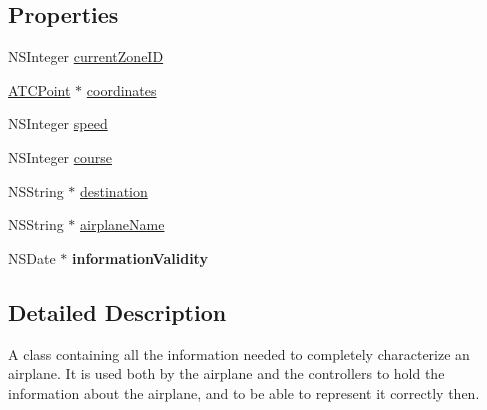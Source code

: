\subsection*{\-Properties}
\begin{DoxyCompactItemize}
\item 
\-N\-S\-Integer \hyperlink{interface_a_t_c_airplane_information_af795c45df27d97b4194ea6c1f640cf9f}{current\-Zone\-I\-D}
\item 
\hyperlink{interface_a_t_c_point}{\-A\-T\-C\-Point} $\ast$ \hyperlink{interface_a_t_c_airplane_information_a1feb624e5acd0a158e94f089f977c38c}{coordinates}
\item 
\-N\-S\-Integer \hyperlink{interface_a_t_c_airplane_information_a3c51274a6f30a1f0658c6eb2d6f343d6}{speed}
\item 
\-N\-S\-Integer \hyperlink{interface_a_t_c_airplane_information_a3184f5c6d3a5a6faac3c0809163f471d}{course}
\item 
\-N\-S\-String $\ast$ \hyperlink{interface_a_t_c_airplane_information_a436971fb85545905060e5a6d46cd4c28}{destination}
\item 
\-N\-S\-String $\ast$ \hyperlink{interface_a_t_c_airplane_information_a1d08b25f87906549c53e16c9ec1e42fc}{airplane\-Name}
\item 
\hypertarget{interface_a_t_c_airplane_information_a9fcdcc36700159b4437a8b5bfb08f40b}{
\-N\-S\-Date $\ast$ {\bfseries information\-Validity}}
\label{interface_a_t_c_airplane_information_a9fcdcc36700159b4437a8b5bfb08f40b}

\end{DoxyCompactItemize}


\subsection{\-Detailed \-Description}
\-A class containing all the information needed to completely characterize an airplane. \-It is used both by the airplane and the controllers to hold the information about the airplane, and to be able to represent it correctly then. 

